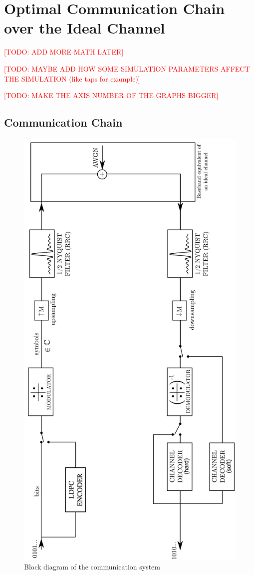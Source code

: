 \section{Optimal Communication Chain over the Ideal Channel}
\textcolor{red}{[TODO: ADD MORE MATH LATER]}\par
\textcolor{red}{[TODO: MAYBE ADD HOW SOME SIMULATION PARAMETERS AFFECT THE SIMULATION (like taps for example)]}\par
\textcolor{red}{[TODO: MAKE THE AXIS NUMBER OF THE GRAPHS BIGGER]}\par
\subsection{Communication Chain}
\begin{figure}[H]
	\centering
	\includegraphics[angle=-90, width=0.9\linewidth]{Images/com-chain}
	\caption{Block diagram of the communication system}
	\label{fig:com-chain}
\end{figure}
